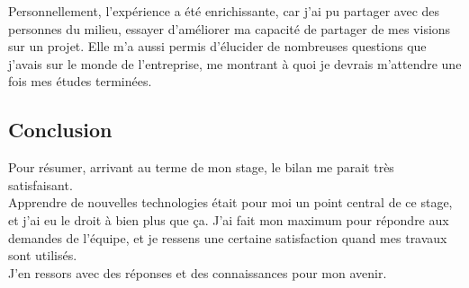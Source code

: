 \documentclass{rapport}
\begin{document}
Personnellement, l'expérience a été enrichissante, car j'ai pu partager avec des personnes du milieu, essayer d'améliorer ma capacité de partager de mes visions sur un projet. Elle m'a aussi permis d'élucider de nombreuses questions que j'avais sur le monde de l'entreprise, me montrant à quoi je devrais m'attendre une fois mes études terminées.

\subsection*{Conclusion}
Pour résumer, arrivant au terme de mon stage, le bilan me parait très satisfaisant. \\
Apprendre de nouvelles technologies était pour moi un point central de ce stage, et j'ai eu le droit à bien plus que ça. J'ai fait mon maximum pour répondre aux demandes de l'équipe, et je ressens une certaine satisfaction quand mes travaux sont utilisés. \\
J'en ressors avec des réponses et des connaissances pour mon avenir.
\end{document}
